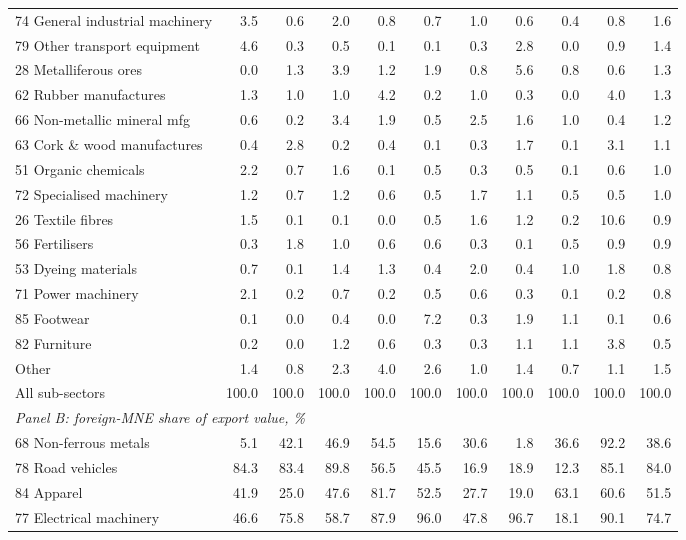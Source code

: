 \begin{tabular}{lrrrrrrrrrr}
74 General industrial machinery & 3.5 & 0.6 & 2.0 & 0.8 & 0.7 & 1.0 & 0.6 & 0.4 & 0.8 & 1.6 \\
79 Other transport equipment & 4.6 & 0.3 & 0.5 & 0.1 & 0.1 & 0.3 & 2.8 & 0.0 & 0.9 & 1.4 \\
28 Metalliferous ores & 0.0 & 1.3 & 3.9 & 1.2 & 1.9 & 0.8 & 5.6 & 0.8 & 0.6 & 1.3 \\
62 Rubber manufactures & 1.3 & 1.0 & 1.0 & 4.2 & 0.2 & 1.0 & 0.3 & 0.0 & 4.0 & 1.3 \\
66 Non-metallic mineral mfg & 0.6 & 0.2 & 3.4 & 1.9 & 0.5 & 2.5 & 1.6 & 1.0 & 0.4 & 1.2 \\
63 Cork \& wood manufactures & 0.4 & 2.8 & 0.2 & 0.4 & 0.1 & 0.3 & 1.7 & 0.1 & 3.1 & 1.1 \\
51 Organic chemicals & 2.2 & 0.7 & 1.6 & 0.1 & 0.5 & 0.3 & 0.5 & 0.1 & 0.6 & 1.0 \\
72 Specialised machinery & 1.2 & 0.7 & 1.2 & 0.6 & 0.5 & 1.7 & 1.1 & 0.5 & 0.5 & 1.0 \\
26 Textile fibres & 1.5 & 0.1 & 0.1 & 0.0 & 0.5 & 1.6 & 1.2 & 0.2 & 10.6 & 0.9 \\
56 Fertilisers & 0.3 & 1.8 & 1.0 & 0.6 & 0.6 & 0.3 & 0.1 & 0.5 & 0.9 & 0.9 \\
53 Dyeing materials & 0.7 & 0.1 & 1.4 & 1.3 & 0.4 & 2.0 & 0.4 & 1.0 & 1.8 & 0.8 \\
71 Power machinery & 2.1 & 0.2 & 0.7 & 0.2 & 0.5 & 0.6 & 0.3 & 0.1 & 0.2 & 0.8 \\
85 Footwear & 0.1 & 0.0 & 0.4 & 0.0 & 7.2 & 0.3 & 1.9 & 1.1 & 0.1 & 0.6 \\
82 Furniture & 0.2 & 0.0 & 1.2 & 0.6 & 0.3 & 0.3 & 1.1 & 1.1 & 3.8 & 0.5 \\
Other & 1.4 & 0.8 & 2.3 & 4.0 & 2.6 & 1.0 & 1.4 & 0.7 & 1.1 & 1.5 \\
All sub-sectors & 100.0 & 100.0 & 100.0 & 100.0 & 100.0 & 100.0 & 100.0 & 100.0 & 100.0 & 100.0 \\
\midrule
\multicolumn{11}{l}{\textit{Panel B: foreign-MNE share of export value, \%}} \\
68 Non-ferrous metals & 5.1 & 42.1 & 46.9 & 54.5 & 15.6 & 30.6 & 1.8 & 36.6 & 92.2 & 38.6 \\
78 Road vehicles & 84.3 & 83.4 & 89.8 & 56.5 & 45.5 & 16.9 & 18.9 & 12.3 & 85.1 & 84.0 \\
84 Apparel & 41.9 & 25.0 & 47.6 & 81.7 & 52.5 & 27.7 & 19.0 & 63.1 & 60.6 & 51.5 \\
77 Electrical machinery & 46.6 & 75.8 & 58.7 & 87.9 & 96.0 & 47.8 & 96.7 & 18.1 & 90.1 & 74.7 \\

\end{tabular}
